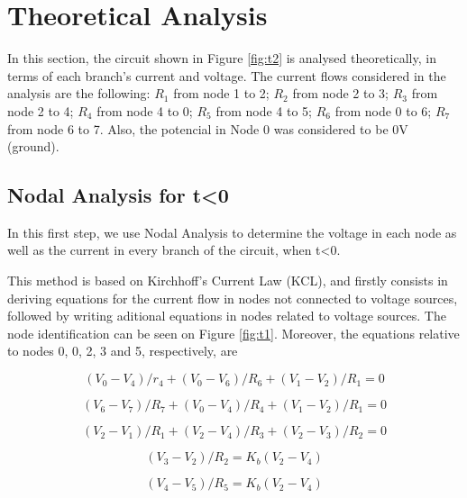 \section{Theoretical Analysis}
\label{sec:analysis}

In this section, the circuit shown in Figure \ref{fig:t2} is analysed
theoretically, in terms of each branch's current and voltage.
The current flows considered in the analysis are the following:
$R_1$ from node 1 to 2; $R_2$ from node 2 to 3; $R_3$ from node 2 to 4; $R_4$ from node 4 to 0; $R_5$ from node 4 to 5; $R_6$ from node 0 to 6; $R_7$ from node 6 to 7. Also, the potencial in Node 0 was considered to be 0V (ground).

\subsection{Nodal Analysis for t<0}

In this first step, we use Nodal Analysis to determine the voltage in each node as well as the current in every branch of the circuit, when t<0. \par 
This method is based on Kirchhoff's Current Law (KCL), and firstly consists in
deriving equations for the current flow in nodes not connected to voltage sources,
followed by writing aditional equations in nodes related to voltage sources. The node 
identification can be seen on Figure \ref{fig:t1}. Moreover, the equations relative to
nodes 0, 0, 2, 3 and 5, respectively, are

\begin{equation}
  (V_0 - V_4)/r_4 + (V_0 - V_6)/R_6 + (V_1 - V_2)/R_1 = 0 
  \label{eq:kvl1}
\end{equation}

\begin{equation}
  (V_6 - V_7)/R_7 + (V_0 - V_4)/R_4 + (V_1 - V_2)/R_1 = 0 
  \label{eq:kvl2}
\end{equation}

\begin{equation}
  (V_2 - V_1)/R_1 + (V_2 - V_4)/R_3 + (V_2 - V_3)/R_2 = 0
  \label{eq:kvl3}
\end{equation}

\begin{equation}
  (V_3 - V_2)/R_2 = K_b(V_2 - V_4)
  \label{eq:kvl4}
\end{equation}

\begin{equation}
  (V_4 - V_5)/R_5 = K_b(V_2 - V_4)
  \label{eq:kvl5}
\end{equation}


